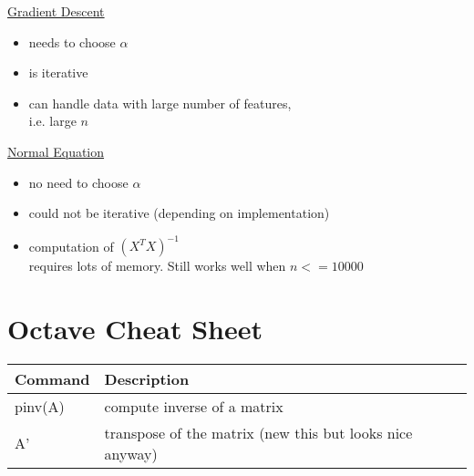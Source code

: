 \documentclass[11pt,a4paper]{article}
\begin{document}
\begin{multicols}{2}
\underline{Gradient Descent}
\begin{itemize}
\item needs to choose $\alpha$
\item is iterative
\item can handle data with large number of features,\\ i.e. large $n$
\end{itemize}

\columnbreak
\underline{Normal Equation}\\
\begin{itemize}
\item no need to choose $\alpha$
\item could not be iterative (depending on implementation)
\item computation of $(X^TX)^{-1}$\\ requires lots of memory. Still works well when $n <= 10000$
\end{itemize}
\end{multicols}


\section*{Octave Cheat Sheet}
\begin{tabular}{l|l}
\textbf{Command}&\textbf{Description}\\
\hline
pinv(A)&compute inverse of a matrix\\
A'&transpose of the matrix (new this but looks nice anyway)
\end{tabular}
\end{document}
